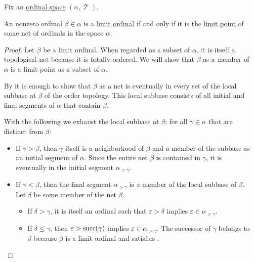 \begin{proposition}\label{thm:limit_ordinal_order_topology}
  Fix an \hyperref[def:ordinal_space]{ordinal space} \( (\alpha, \mscrT) \).

  An nonzero ordinal \( \beta \in \alpha \) is a \hyperref[def:limit_ordinal]{limit ordinal} if and only if it is the \hyperref[def:net_convergence/limit]{limit point} of some net of ordinals in the space \( \alpha \).
\end{proposition}
\begin{proof}
  \SufficiencySubProof Let \( \beta \) be a limit ordinal. When regarded as a subset of \( \alpha \), it is itself a topological net because it is totally ordered. We will show that \( \beta \) as a member of \( \alpha \) is a limit point as a subset of \( \alpha \).

  By  it is enough to show that \( \beta \) as a net is eventually in every set of the local subbase at \( \beta \) of the order topology. This local subbase consists of all initial and final segments of \( \alpha \) that contain \( \beta \).

  With the following we exhaust the local subbase at \( \beta \): for all \( \gamma \in \alpha \) that are distinct from \( \beta \):
  \begin{itemize}
    \item If \( \gamma > \beta \), then \( \gamma \) itself is a neighborhood of \( \beta \) and a member of the subbase as an initial segment of \( \alpha \). Since the entire net \( \beta \) is contained in \( \gamma \), it is eventually in the initial segment \( \alpha_{>\gamma} \).

    \item If \( \gamma < \beta \), then the final segment \( \alpha_{>\gamma} \) is a member of the local subbase of \( \beta \). Let \( \delta \) be some member of the net \( \beta \).
    \begin{itemize}
      \item If \( \delta > \gamma \), it is itself an ordinal such that \( \varepsilon > \delta \) implies \( \varepsilon \in \alpha_{>\gamma} \).
      \item If \( \delta \leq \gamma \), then \( \varepsilon > \operatorname{succ}(\gamma) \) implies \( \varepsilon \in \alpha_{>\gamma} \). The successor of \( \gamma \) belongs to \( \beta \) because \( \beta \) is a limit ordinal and satisfies .
    \end{itemize}


\end{itemize}
\end{proof}
